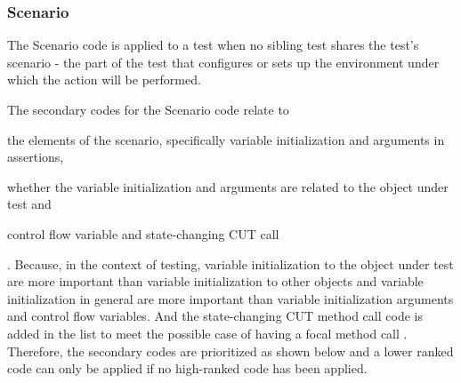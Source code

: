 \documentclass[proposal.tex]{subfiles}
\begin{document}
\subsubsection{Scenario}

The Scenario code is applied to a test when no sibling test shares the test’s scenario - the part of the test that configures or sets up the environment under which the action will be performed.

The secondary codes for the Scenario code relate to 
\begin{enumerate*}[label=(\roman*)]
    \item the elements of the scenario, specifically variable initialization and arguments in assertions, 
    \item whether the variable initialization and arguments are related to the object under test and 
    \item control flow variable and state-changing CUT call
\end{enumerate*}.
Because, in the context of testing, variable initialization to the object under test are more important than variable initialization to other objects and variable initialization in general are more important than variable initialization arguments and control flow variables.
%
And the state-changing CUT method call code is added in the list to meet the possible case of having a focal method call \cite{ghafari2015automatically}.
%
Therefore, the secondary codes are prioritized as shown below and a lower ranked code can only be applied if no high-ranked code has been applied.
\end{document}

